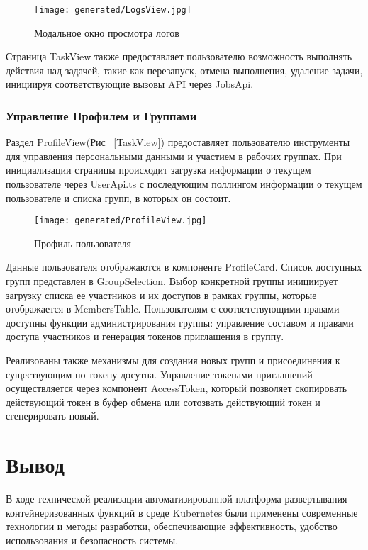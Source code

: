 \begin{figure*}[!t]
  \centering
  \texttt{[image: generated/LogsView.jpg]}
  \caption{Модальное окно просмотра логов}
  \label{LogsView}
\end{figure*}

Страница TaskView также предоставляет пользователю возможность выполнять действия над задачей, такие как перезапуск, отмена выполнения, удаление задачи, инициируя соответствующие вызовы API через JobsApi.

\subsubsection{Управление Профилем и Группами}

Раздел ProfileView(Рис ~\ref{TaskView}) предоставляет пользователю инструменты для управления персональными данными и участием в рабочих группах.
При инициализации страницы происходит загрузка информации о текущем пользователе через UserApi.ts с последующим поллингом информации о текущем пользователе и списка групп, в которых он состоит.

\begin{figure*}[!t]
  \centering
  \texttt{[image: generated/ProfileView.jpg]}
  \caption{Профиль пользователя}
  \label{ProfileView}
\end{figure*}

Данные пользователя отображаются в компоненте ProfileCard.
Список доступных групп представлен в GroupSelection.
Выбор конкретной группы инициирует загрузку списка ее участников и их доступов в рамках группы, которые отображается в MembersTable.
Пользователям с соответствующими правами доступны функции администрирования группы: управление составом и правами доступа участников и генерация токенов приглашения в группу.

Реализованы также механизмы для создания новых групп и присоединения к существующим по токену досутпа.
Управление токенами приглашений осуществляется через компонент AccessToken, который позволяет скопировать действующий токен в буфер обмена или сотозвать действующий токен и сгенерировать новый.

\section{Вывод}

В ходе технической реализации автоматизированной платформа развертывания контейнеризованных функций в среде Kubernetes были применены современные технологии и методы разработки, обеспечивающие эффективность, удобство использования и безопасность системы.


